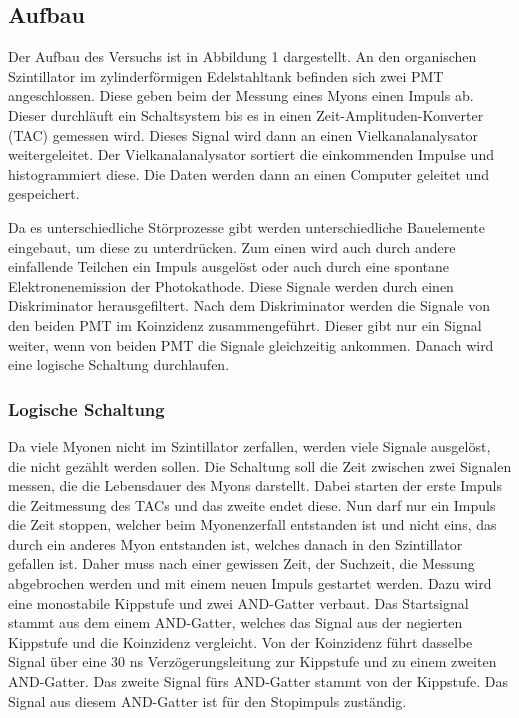 

\subsection{Aufbau}
Der Aufbau des Versuchs ist in Abbildung 1 dargestellt.  An den organischen Szintillator im zylinderförmigen Edelstahltank befinden sich zwei PMT angeschlossen. 
Diese geben beim der Messung eines Myons einen Impuls ab. Dieser durchläuft ein Schaltsystem bis es in einen Zeit-Amplituden-Konverter (TAC) gemessen wird.  
Dieses Signal wird dann an einen Vielkanalanalysator weitergeleitet. Der Vielkanalanalysator sortiert die einkommenden Impulse und histogrammiert diese.
Die Daten werden dann an einen Computer geleitet und gespeichert.

Da es unterschiedliche Störprozesse gibt werden unterschiedliche Bauelemente eingebaut, um diese zu unterdrücken.
Zum einen wird auch durch andere einfallende Teilchen ein Impuls ausgelöst oder auch durch eine spontane Elektronenemission der Photokathode. 
Diese Signale werden durch einen Diskriminator herausgefiltert. Nach dem Diskriminator werden die Signale von den beiden PMT im Koinzidenz zusammengeführt. 
Dieser gibt nur ein Signal weiter, wenn von beiden PMT die Signale gleichzeitig ankommen. Danach wird eine logische Schaltung durchlaufen.


\subsubsection{Logische Schaltung}
Da viele Myonen nicht im Szintillator zerfallen, werden viele Signale ausgelöst, die nicht gezählt werden sollen. Die Schaltung soll die Zeit zwischen zwei Signalen
messen, die die Lebensdauer des Myons darstellt. 
Dabei starten der erste Impuls die Zeitmessung des TACs und das zweite endet diese. 
Nun darf nur ein Impuls die Zeit stoppen, welcher beim Myonenzerfall entstanden ist und nicht eins, das durch ein anderes Myon entstanden ist, welches danach in 
den Szintillator gefallen ist. 
Daher muss nach einer gewissen Zeit, der Suchzeit, die Messung abgebrochen werden und mit einem neuen Impuls gestartet werden.
Dazu wird eine monostabile Kippstufe und zwei AND-Gatter verbaut. 
Das Startsignal stammt aus dem einem AND-Gatter, welches das Signal aus der negierten Kippstufe und die Koinzidenz vergleicht.  
Von der Koinzidenz führt dasselbe Signal über eine 30 ns Verzögerungsleitung zur Kippstufe und zu einem zweiten AND-Gatter. 
Das zweite Signal fürs AND-Gatter stammt von der Kippstufe.  Das Signal aus diesem AND-Gatter ist für den Stopimpuls zuständig.

